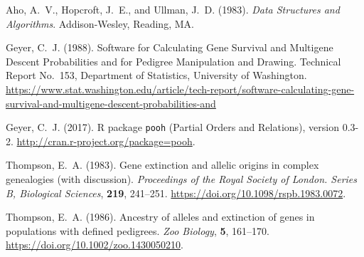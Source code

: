\documentclass[11pt]{article}
\begin{document}
\begin{thebibliography}{}

Aho, A.~V., Hopcroft, J.~E., and Ullman, J.~D. (1983).
\newblock \emph{Data Structures and Algorithms}.
\newblock Addison-Wesley, Reading, MA.

Geyer, C.~J. (1988).
\newblock Software for Calculating Gene Survival and Multigene Descent
    Probabilities and for Pedigree Manipulation and Drawing.
\newblock Technical Report No.~153, Department of Statistics,
    University of Washington.
\newblock \url{https://www.stat.washington.edu/article/tech-report/software-calculating-gene-survival-and-multigene-descent-probabilities-and}

Geyer, C.~J. (2017).
\newblock R package \texttt{pooh} (Partial Orders and Relations), version 0.3-2.
\newblock \url{http://cran.r-project.org/package=pooh}.

Thompson, E.~A. (1983).
\newblock Gene extinction and allelic origins in complex genealogies
    (with discussion).
\newblock \emph{Proceedings of the Royal Society of London. Series B,
    Biological Sciences}, \textbf{219}, 241--251.
\newblock \url{https://doi.org/10.1098/rspb.1983.0072}.

Thompson, E.~A. (1986).
\newblock Ancestry of alleles and extinction of genes in populations with
    defined pedigrees.
\newblock \emph{Zoo Biology}, \textbf{5}, 161--170.
\newblock \url{https://doi.org/10.1002/zoo.1430050210}.

\end{thebibliography}
\end{document}

